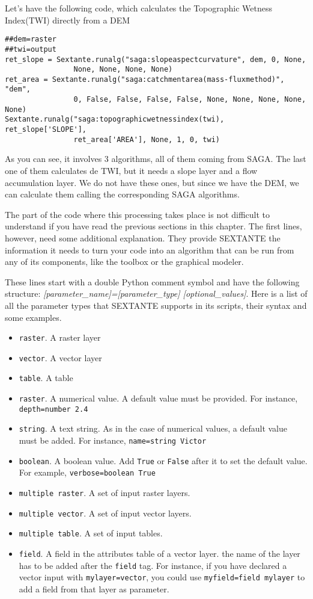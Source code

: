 Let's have the following code, which calculates the Topographic Wetness Index(TWI) directly from a DEM

\begin{verbatim}
##dem=raster
##twi=output
ret_slope = Sextante.runalg("saga:slopeaspectcurvature", dem, 0, None, 
                None, None, None, None)
ret_area = Sextante.runalg("saga:catchmentarea(mass-fluxmethod)", "dem", 
                0, False, False, False, False, None, None, None, None, None)
Sextante.runalg("saga:topographicwetnessindex(twi), ret_slope['SLOPE'], 
                ret_area['AREA'], None, 1, 0, twi)
\end{verbatim}


As you can see, it involves 3 algorithms, all of them coming from SAGA. The last one of them calculates de TWI, but it needs a slope layer and a flow accumulation layer. We do not have these ones, but since we have the DEM, we can calculate them calling the corresponding SAGA algorithms.

The part of the code where this processing takes place is not difficult to understand if you have read the previous sections in this chapter. The first lines, however, need some additional explanation. They provide SEXTANTE the information it needs to turn your code into an algorithm that can be run from any of its components, like the toolbox or the graphical modeler.

These lines start with a double Python comment symbol and have the following structure: \emph{[parameter\_name]=[parameter\_type] [optional\_values]}. Here is a list of all the parameter types that SEXTANTE supports in its scripts, their syntax and some examples.

\begin{itemize}
	\item \texttt{raster}. A raster layer
	\item \texttt{vector}. A vector layer
	\item \texttt{table}. A table
	\item \texttt{raster}. A numerical value. A default value must be provided. For instance, \texttt{depth=number 2.4}
	\item \texttt{string}. A text string. As in the case of numerical values, a default value must be added. For instance, \texttt{name=string Victor}
	\item \texttt{boolean}. A boolean value. Add \texttt{True} or \texttt{False} after it to set the default value. For example, \texttt{verbose=boolean True}
	\item \texttt{multiple raster}. A set of input raster layers.
	\item \texttt{multiple vector}. A set of input vector layers.
	\item \texttt{multiple table}. A set of input tables.
	\item \texttt{field}. A field in the attributes table of a vector layer. the name of the layer has to be added after the \texttt{field} tag. For instance, if you have declared a vector input with \texttt{mylayer=vector}, you could use \texttt{myfield=field mylayer} to add a field from that layer as parameter.
\end{itemize}

